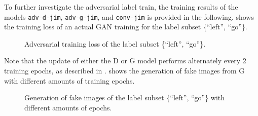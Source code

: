 \FloatBarrier
\noindent
To further investigate the adversarial label train, the training results of the models \texttt{adv-d-jim}, \texttt{adv-g-jim}, and \texttt{conv-jim} is provided in the following.
 shows the training loss of an actual GAN training for the label subset \{\enquote{left}, \enquote{go}\}.
\begin{figure}[!ht]
  \centering
  \caption{Adversarial training loss of the label subset \{\enquote{left}, \enquote{go}\}.}
  \label{fig:nn_adv_loss_label}
\end{figure}
\FloatBarrier
\noindent
Note that the update of either the D or G model performs alternately every 2 training epochs, as described in .
 shows the generation of fake images from G with different amounts of training epochs.
\begin{figure}[!ht]
  \centering
  \caption{Generation of fake images of the label subset \{\enquote{left}, \enquote{go}\} with different amounts of epochs.}
  \label{fig:nn_adv_fakes_label}
\end{figure}
